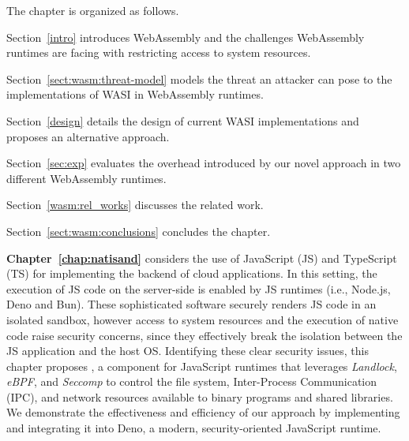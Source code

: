\smallskip
\noindent The chapter is organized as follows.
\begin{compactitem}
    \item Section~\ref{intro} introduces WebAssembly and the
     challenges WebAssembly runtimes are facing with restricting
     access to system resources.
    \item Section~\ref{sect:wasm:threat-model} models the threat
     an attacker can pose to the implementations of WASI in
     WebAssembly runtimes.
    \item Section~\ref{design} details the design of current
     WASI implementations and proposes an alternative approach.
    \item Section~\ref{sec:exp} evaluates the overhead introduced by
     our novel approach in two different WebAssembly runtimes.
    \item Section~\ref{wasm:rel_works} discusses the related work.
    \item Section~\ref{sect:wasm:conclusions} concludes the chapter.
\end{compactitem}
\medskip

\textbf{Chapter~\ref{chap:natisand}} considers the use of
JavaScript (JS) and TypeScript (TS) for implementing the backend of
cloud applications. In this setting, the execution of JS code on the
server-side is enabled by JS runtimes (i.e., Node.js, Deno and Bun).
These sophisticated software securely renders JS code in an isolated
sandbox, however access to system resources and the execution of
native code raise security concerns, since they effectively break the
isolation between the JS application and the host OS. Identifying these
clear security issues, this chapter proposes \natisand, a component for
JavaScript runtimes that leverages {\em Landlock}, {\em eBPF}, and
{\em Seccomp} to control the file system, Inter-Process Communication
(IPC), and network resources available to binary programs and shared
libraries. We demonstrate the effectiveness and efficiency of our
approach by implementing and integrating it into Deno, a modern,
security-oriented JavaScript runtime.

